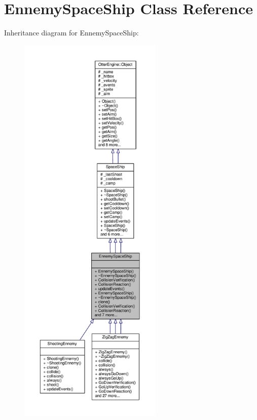 \hypertarget{class_ennemy_space_ship}{}\section{Ennemy\+Space\+Ship Class Reference}
\label{class_ennemy_space_ship}


Inheritance diagram for Ennemy\+Space\+Ship\+:\nopagebreak
\begin{figure}[H]
\begin{center}
\leavevmode
\includegraphics[height=550pt]{da/d23/class_ennemy_space_ship__inherit__graph}
\end{center}
\end{figure}


